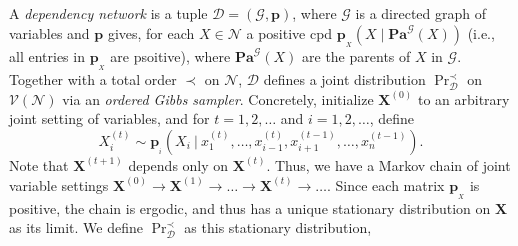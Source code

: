 \documentclass[letterpaper]{article} %
\theoremstyle{plain}
\theoremstyle{definition}
\theoremstyle{remark}
\newcommand\mat[1]{\mathbf{#1}}
\newcommand{\bp}[1][L]{\mat{p}_{\!_{#1}\!}}
\newcommand{\V}{\mathcal V}
\newcommand{\N}{\mathcal N}
\newcommand\Pa{\mathbf{Pa}}
\newcommand{\Gr}{\mathcal G}
\begin{document}
{\begin{defn}
A \emph{dependency network} is a tuple $\mathcal D = (\Gr, \mat p) $, where
$\Gr$ is a 
directed graph of variables and $\mat p$ gives, for each $X \in \N$ a
positive cpd $\bp[X](X \mid \Pa^{\Gr}(X))$ (i.e., all entries in $\bp[X]$ are
psoitive),
where $\Pa^{\Gr}(X)$ are the parents of $X$ in $\Gr$.
Together with a total order $\prec$ on $\N$,
$\mathcal D$ defines a joint distribution $\Pr^\prec_{\mathcal D}$ on $\V(\N)$ via an \emph{ordered Gibbs sampler}. 
Concretely,
initialize $\mat X^{(0)}$ to an arbitrary joint setting of variables, and
for $t= 1,2, \ldots$ and $i=1,2,\ldots$, define
\[
	 X_i^{(t)} \sim \bp[i]\left(X_i ~\big|~ x_1^{(t)}, \ldots,
x_{i-1}^{(t)}, x_{i+1}^{(t-1)}, \ldots, x^{(t-1)}_{n} \right).  
\]
Note that $\mat X^{(t+1)}$
depends only on $\mat X^{(t)}$. Thus, we have a Markov chain of
joint variable settings 
$ \mat X^{(0)} \to \mat X^{(1)} \to \ldots \to \mat X^{(t)} \to \ldots$.
Since each matrix $\bp[X]$ is positive,
the chain is
ergodic, 
and thus has a unique stationary distribution on $\mat X$ as its limit.
We define $\Pr^\prec_{\mathcal D}$ as this stationary distribution,
\end{defn}

}
\end{document}
